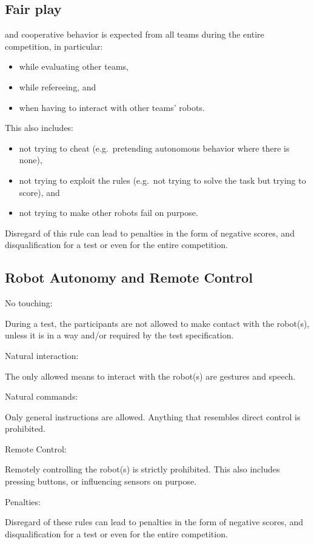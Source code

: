 \subsection{Fair play}
\label{rule:fairplay}
 and cooperative behavior is expected from all teams during the entire competition, in particular:
\begin{itemize}
	\item while evaluating other teams, 
	\item while refereeing, and 
	\item when having to interact with other teams' robots.  
\end{itemize}
This also includes:
\begin{itemize}
	\item not trying to cheat (e.g.~pretending autonomous behavior where there is none), 
	\item not trying to exploit the rules (e.g.~not trying to solve the task but trying to score), and 
	\item not trying to make other robots fail on purpose. 
\end{itemize}
Disregard of this rule can lead to penalties in the form of negative scores, and disqualification for a test or even for the entire competition. 

\subsection{Robot Autonomy and Remote Control}
\begin{enumerate}
	{\bf\item No touching:} During a test, the participants are not allowed to make contact with the robot(s), unless it is in a  way and/or required by the test specification. 
	{\bf\item Natural interaction:} The only allowed means to interact with the robot(s) are gestures and speech.
	{\bf\item Natural commands:} Only general instructions are allowed. 
	Anything that resembles direct control is prohibited.
	{\bf\item Remote Control:} Remotely controlling the robot(s) is strictly prohibited. This also includes pressing buttons, or influencing sensors on purpose.
	{\bf\item Penalties:} Disregard of these rules can lead to penalties in the form of negative scores, and disqualification for a test or even for the entire competition. 
\end{enumerate}

